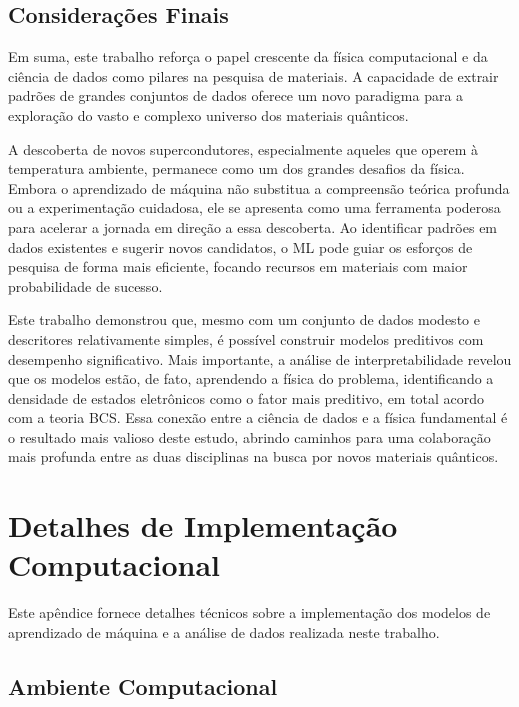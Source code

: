 \documentclass[12pt, a4paper, oneside]{report}
\begin{document}
\section{Considerações Finais}

Em suma, este trabalho reforça o papel crescente da física computacional e da ciência de dados como pilares na pesquisa de materiais. A capacidade de extrair padrões de grandes conjuntos de dados oferece um novo paradigma para a exploração do vasto e complexo universo dos materiais quânticos.

A descoberta de novos supercondutores, especialmente aqueles que operem à temperatura ambiente, permanece como um dos grandes desafios da física. Embora o aprendizado de máquina não substitua a compreensão teórica profunda ou a experimentação cuidadosa, ele se apresenta como uma ferramenta poderosa para acelerar a jornada em direção a essa descoberta. Ao identificar padrões em dados existentes e sugerir novos candidatos, o ML pode guiar os esforços de pesquisa de forma mais eficiente, focando recursos em materiais com maior probabilidade de sucesso.

Este trabalho demonstrou que, mesmo com um conjunto de dados modesto e descritores relativamente simples, é possível construir modelos preditivos com desempenho significativo. Mais importante, a análise de interpretabilidade revelou que os modelos estão, de fato, aprendendo a física do problema, identificando a densidade de estados eletrônicos como o fator mais preditivo, em total acordo com a teoria BCS. Essa conexão entre a ciência de dados e a física fundamental é o resultado mais valioso deste estudo, abrindo caminhos para uma colaboração mais profunda entre as duas disciplinas na busca por novos materiais quânticos.

\appendix
\chapter{Detalhes de Implementação Computacional}
\label{app:implementacao}

Este apêndice fornece detalhes técnicos sobre a implementação dos modelos de aprendizado de máquina e a análise de dados realizada neste trabalho.

\section{Ambiente Computacional}
\end{document}
